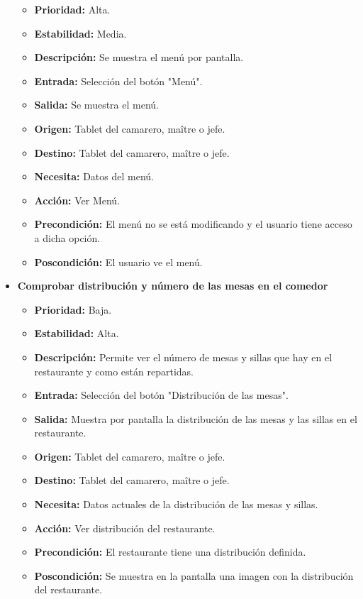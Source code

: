 \documentclass[spanish,a4paper,11pt, twoside]{report}	%
\begin{document}
\begin{itemize}
		\begin{itemize}
			\item \textbf{Prioridad: } Alta.
			\item \textbf{Estabilidad: } Media.
			\item \textbf{Descripción: } Se muestra el menú por pantalla.
			\item \textbf{Entrada: } Selección del botón "Menú".
			\item \textbf{Salida: } Se muestra el menú.
			\item \textbf{Origen: } Tablet del camarero, maître o jefe.
			\item \textbf{Destino: } Tablet del camarero, maître o jefe.
			\item \textbf{Necesita: } Datos del menú.
			\item \textbf{Acción: } Ver Menú.
			\item \textbf{Precondición: } El menú no se está modificando y el usuario tiene acceso a dicha opción.
			\item \textbf{Poscondición: } El usuario ve el menú.


		\end{itemize}%


		\item \textbf{Comprobar distribución y número de las mesas en el comedor} %

		\begin{itemize}
			\item \textbf{Prioridad: } Baja.
			\item \textbf{Estabilidad: } Alta.
			\item \textbf{Descripción: } Permite ver el número de mesas y sillas que hay en el restaurante y como están repartidas.
			\item \textbf{Entrada: } Selección del botón "Distribución de las mesas".
			\item \textbf{Salida: } Muestra por pantalla la distribución de las mesas y las sillas en el restaurante.
			\item \textbf{Origen: } Tablet del camarero, maître o jefe.
			\item \textbf{Destino: } Tablet del camarero, maître o jefe. 
			\item \textbf{Necesita: } Datos actuales de la distribución de las mesas y sillas.
			\item \textbf{Acción: } Ver distribución del restaurante.
			\item \textbf{Precondición: } El restaurante tiene una distribución definida.
			\item \textbf{Poscondición: } Se muestra en la pantalla una imagen con la distribución del restaurante.


\end{itemize}
\end{itemize}
\end{document}
